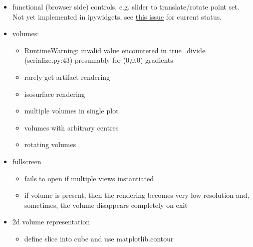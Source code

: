 \documentclass[10pt,parskip=half,
	toc=sectionentrywithdots,
	bibliography=totocnumbered,
	captions=tableheading,numbers=noendperiod]{scrartcl}
\providecommand{\tightlist}{%
  \setlength{\itemsep}{0pt}\setlength{\parskip}{0pt}}
\begin{document}
\begin{itemize}
\tightlist
\item
  functional (browser side) controls, e.g. slider to translate/rotate
  point set. Not yet implemented in ipywidgets, see
  \href{https://github.com/jupyter-widgets/ipywidgets/issues/1109}{this
  issue} for current status.
\item
  volumes:

  \begin{itemize}
  \tightlist
  \item
    RuntimeWarning: invalid value encountered in true\_divide
    (serialize.py:43) presumably for (0,0,0) gradients
  \item
    rarely get artifact rendering
  \item
    isosurface rendering
  \item
    multiple volumes in single plot
  \item
    volumes with arbitrary centres
  \item
    rotating volumes
  \end{itemize}
\item
  fullscreen

  \begin{itemize}
  \tightlist
  \item
    fails to open if multiple views instantiated
  \item
    if volume is present, then the rendering becomes very low resolution
    and, sometimes, the volume disappears completely on exit
  \end{itemize}
\item
  2d volume representation

  \begin{itemize}
  \tightlist
  \item
    define slice into cube and use matplotlib.contour
  \end{itemize}
\end{itemize}

	
\end{document}
